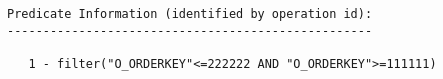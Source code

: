 \documentclass[11pt,a4paper,parskip=half]{scrartcl}
\begin{document}
\begin{lstlisting}
Predicate Information (identified by operation id):                                                                                                                                                                                                                                                          
---------------------------------------------------                                                                                                                                                                                                                                                          
                                                                                                                                                                                                                                                                                                             
   1 - filter("O_ORDERKEY"<=222222 AND "O_ORDERKEY">=111111)  
\end{lstlisting}
\end{document}
